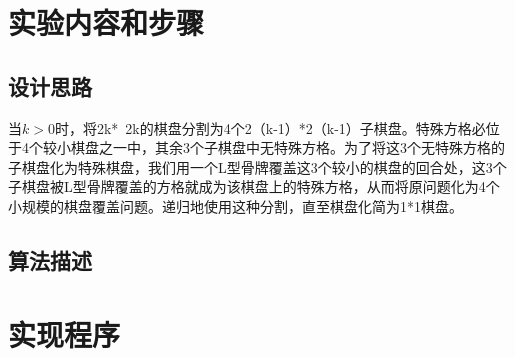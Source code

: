 \documentclass{zjureport}
\begin{document}
\section{实验内容和步骤}


  \subsection{设计思路}
  当$k > 0 $时，将2k* 2k的棋盘分割为4个2（k-1）*2（k-1）子棋盘。特殊方格必位于4个较小棋盘之一中，其余3个子棋盘中无特殊方格。为了将这3个无特殊方格的子棋盘化为特殊棋盘，我们用一个L型骨牌覆盖这3个较小的棋盘的回合处，这3个子棋盘被L型骨牌覆盖的方格就成为该棋盘上的特殊方格，从而将原问题化为4个小规模的棋盘覆盖问题。递归地使用这种分割，直至棋盘化简为1*1棋盘。
 \subsection{算法描述}

\section{实现程序}
	\begin{clause}
		
	\end{clause}
\end{document}

